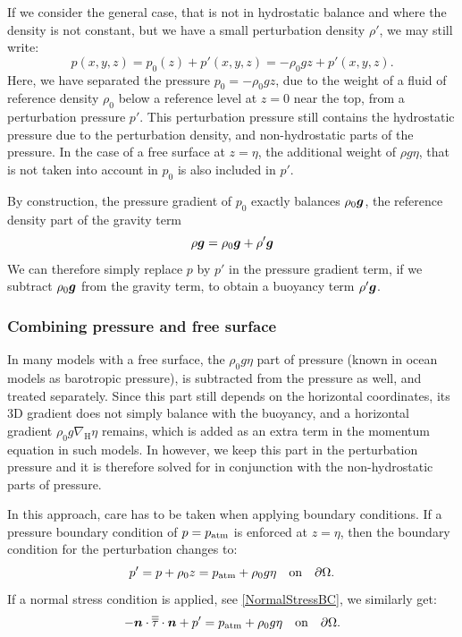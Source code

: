 If we consider the general case, that is not in hydrostatic balance and where
the density is not constant, but we have a small perturbation density 
$\rho'$, we may still write:
\begin{equation}
  p(x,y,z) = p_0(z) + p'(x,y,z) = -\rho_0 g z + p'(x,y,z).
\end{equation}
Here, we have separated the pressure $p_0=-\rho_0 g z$, due to the weight of a fluid of reference density $\rho_0$ below a reference level at $z=0$ near the top, from a perturbation pressure $p'$. This
perturbation pressure still contains the hydrostatic pressure due to the
perturbation density, and non-hydrostatic parts of the pressure. In the 
case of a free surface at $z=\eta$, the additional weight of $\rho g\eta$, that
is not taken into account in $p_0$ is also included in $p'$.

By construction, the pressure gradient of $p_0$ exactly balances $\rho_0{\mbox{\boldmath$g$}}$,
the reference density part of the gravity term
\begin{equation}
  \rho{\mbox{\boldmath$g$}}=\rho_0{\mbox{\boldmath$g$}}+\rho'{\mbox{\boldmath$g$}}
\end{equation}
We can therefore simply replace $p$ by $p'$ in the pressure gradient term, if we
subtract $\rho_0{\mbox{\boldmath$g$}}$ from the gravity term, to obtain a buoyancy term
$\rho'{\mbox{\boldmath$g$}}$.

\subsubsection{Combining pressure and free surface}
In many models with a free surface, the $\rho_0 g\eta$ part of pressure (known
in ocean models as barotropic pressure), is subtracted from the pressure as
well, 
and treated separately. Since this part still depends on the horizontal
coordinates, its 3D gradient does not simply balance with the buoyancy, and a
horizontal gradient $\rho_0g\nabla_{\text{H}}\eta$ remains, which is added as
an extra term in the momentum equation in such models. 
In \fluidity{}
however, we keep this part in the perturbation pressure and it is therefore
solved for in conjunction with the non-hydrostatic parts of pressure. 

In this approach, care has to be taken when applying boundary conditions. If a
pressure boundary condition of $p=p_{\text{atm}}$ is enforced at $z=\eta$, then the
boundary condition for the perturbation changes to:
\begin{equation}
  p'=p+\rho_0 z=p_{\text{atm}}+\rho_0 g\eta
  \quad \textrm{on}\quad \partial\Omega.\label{freesurfacepressure}
\end{equation}
If a normal stress condition is applied, see \eqref{NormalStressBC}, we similarly get:
\begin{equation}
  -{\mbox{\boldmath$n$}}\cdot\overline{\overline{\tau}}\cdot{\mbox{\boldmath$n$}} + p' = p_{\text{atm}} + \rho_0 g\eta
  \quad \textrm{on}\quad \partial\Omega.
  \label{normalstressfreesurface}
\end{equation}

